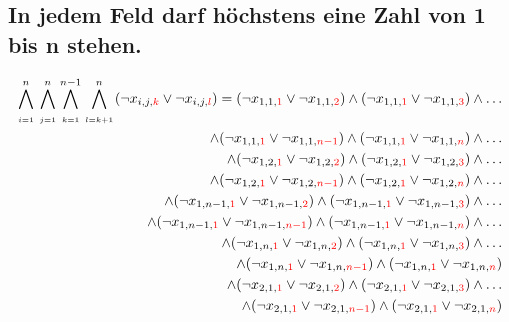 \documentclass[11pt, a4paper]{article}
\begin{document}
	\subsection{In jedem Feld darf höchstens eine Zahl von 1 bis n stehen.}
	\begin{align*}
		\bigwedge_{\atop i=1}^n \bigwedge_{\atop j=1}^n \bigwedge_{\atop k=1}^{n-1} \bigwedge_{\atop l=k+1}^n
		(\neg x_{i,j,{\color{red}k}} \vee \neg x_{i,j,{\color{red}l}}) = 
		(\neg x_{1,1,{\color{red} 1}} \vee \neg x_{1,1,{\color{red} 2}}) 
		\wedge 
		(\neg x_{1,1,{\color{red} 1}} \vee \neg x_{1,1,{\color{red} 3}})
		\wedge \dots \\
		\wedge
		(\neg x_{1,1,{\color{red} 1}} \vee \neg x_{1,1,{\color{red} n-1}})
		\wedge
		(\neg x_{1,1,{\color{red} 1}} \vee \neg x_{1,1,{\color{red} n}})
		\wedge \dots \\
		\wedge
		(\neg x_{1,2,{\color{red} 1}} \vee \neg x_{1,2,{\color{red} 2}}) 
		\wedge 
		(\neg x_{1,2,{\color{red} 1}} \vee \neg x_{1,2,{\color{red} 3}})
		\wedge \dots \\
		\wedge
		(\neg x_{1,2,{\color{red} 1}} \vee \neg x_{1,2,{\color{red} n-1}})
		\wedge
		(\neg x_{1,2,{\color{red} 1}} \vee \neg x_{1,2,{\color{red} n}})
		\wedge \dots \\
		\wedge
		(\neg x_{1,n-1,{\color{red} 1}} \vee \neg x_{1,n-1,{\color{red} 2}}) 
		\wedge 
		(\neg x_{1,n-1,{\color{red} 1}} \vee \neg x_{1,n-1,{\color{red} 3}})
		\wedge \dots \\
		\wedge
		(\neg x_{1,n-1,{\color{red} 1}} \vee \neg x_{1,n-1,{\color{red} n-1}})
		\wedge
		(\neg x_{1,n-1,{\color{red} 1}} \vee \neg x_{1,n-1,{\color{red} n}})
		\wedge \dots \\
		\wedge
		(\neg x_{1,n,{\color{red} 1}} \vee \neg x_{1,n,{\color{red} 2}}) 
		\wedge 
		(\neg x_{1,n,{\color{red} 1}} \vee \neg x_{1,n,{\color{red} 3}})
		\wedge \dots \\
		\wedge
		(\neg x_{1,n,{\color{red} 1}} \vee \neg x_{1,n,{\color{red} n-1}})
		\wedge
		(\neg x_{1,n,{\color{red} 1}} \vee \neg x_{1,n,{\color{red} n}})
		\\
		\wedge (\neg x_{2,1,{\color{red} 1}} \vee \neg x_{2,1,{\color{red} 2}}) 
		\wedge 
		(\neg x_{2,1,{\color{red} 1}} \vee \neg x_{2,1,{\color{red} 3}})
		\wedge \dots \\
		\wedge
		(\neg x_{2,1,{\color{red} 1}} \vee \neg x_{2,1,{\color{red} n-1}})
		\wedge
		(\neg x_{2,1,{\color{red} 1}} \vee \neg x_{2,1,{\color{red} n}})

\end{align*}
\end{document}
